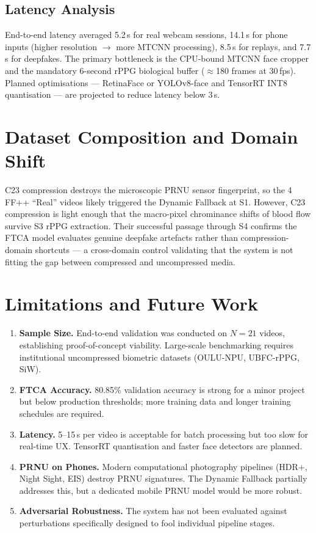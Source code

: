 \documentclass[10pt,twocolumn]{IEEEtran}
\begin{document}
\subsection{Latency Analysis}

End-to-end latency averaged 5.2\,s for real webcam sessions, 14.1\,s for phone inputs (higher resolution $\rightarrow$ more MTCNN processing), 8.5\,s for replays, and 7.7\,s for deepfakes. The primary bottleneck is the CPU-bound MTCNN face cropper and the mandatory 6-second rPPG biological buffer ($\approx$180 frames at 30\,fps). Planned optimisations --- RetinaFace or YOLOv8-face and TensorRT INT8 quantisation --- are projected to reduce latency below 3\,s.

\section{Dataset Composition and Domain Shift}
\label{sec:domain}

C23 compression destroys the microscopic PRNU sensor fingerprint, so the 4 FF++ ``Real'' videos likely triggered the Dynamic Fallback at S1. However, C23 compression is light enough that the macro-pixel chrominance shifts of blood flow survive S3 rPPG extraction. Their successful passage through S4 confirms the FTCA model evaluates genuine deepfake artefacts rather than compression-domain shortcuts --- a cross-domain control validating that the system is not fitting the gap between compressed and uncompressed media.

\section{Limitations and Future Work}
\label{sec:limits}

\begin{enumerate}
  \item \textbf{Sample Size.} End-to-end validation was conducted on $N=21$ videos, establishing proof-of-concept viability. Large-scale benchmarking requires institutional uncompressed biometric datasets (OULU-NPU, UBFC-rPPG, SiW).
  \item \textbf{FTCA Accuracy.} 80.85\% validation accuracy is strong for a minor project but below production thresholds; more training data and longer training schedules are required.
  \item \textbf{Latency.} 5--15\,s per video is acceptable for batch processing but too slow for real-time UX. TensorRT quantisation and faster face detectors are planned.
  \item \textbf{PRNU on Phones.} Modern computational photography pipelines (HDR+, Night Sight, EIS) destroy PRNU signatures. The Dynamic Fallback partially addresses this, but a dedicated mobile PRNU model would be more robust.
  \item \textbf{Adversarial Robustness.} The system has not been evaluated against perturbations specifically designed to fool individual pipeline stages.
\end{enumerate}
\end{document}
